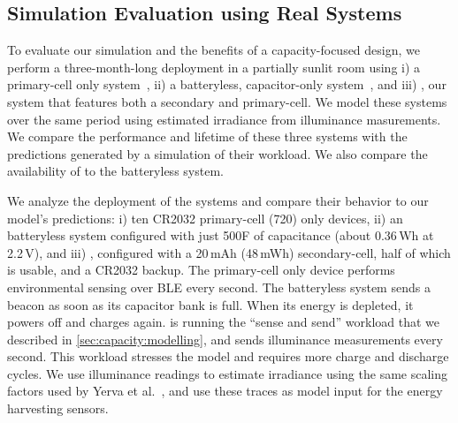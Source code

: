\subsection{Simulation Evaluation using Real Systems}
\label{sec:eval}
To evaluate our simulation and the benefits of a capacity-focused design, 
we perform a three-month-long deployment in a partially sunlit room
using i) a primary-cell only system~\cite{adkins2015michigan}, ii) a batteryless, capacitor-only system~\cite{campbellEnergy14}, and iii) \name, our
system that features both a secondary and primary-cell. 
We model these
systems over the same period using estimated irradiance from \name illuminance masurements. 
We compare the performance and lifetime of these three systems with the predictions generated by a simulation of their workload. 
We also compare the availability of \name to the batteryless system.


We analyze the deployment of the systems 
and compare their behavior to our
model's predictions: i) ten CR2032 primary-cell (720\ssi{\milli\Wh}) only devices, ii) an
batteryless system configured with just 500\textmu F of capacitance (about
0.36\,\textmu Wh at 2.2\,V), and iii) \name, configured with a 20\,mAh
(48\,mWh) secondary-cell, half of which is usable, and a CR2032 backup.  The
primary-cell only device performs environmental sensing over BLE every second.
The batteryless system  sends a beacon as soon as its capacitor bank is full.
When its energy is depleted, it powers off and charges
again. \name is running the ``sense and send'' workload that we described in
\cref{sec:capacity:modelling}, and sends illuminance measurements every second. This
workload stresses the model and requires more charge and discharge cycles.  We
use \name illuminance readings to estimate irradiance using the same scaling factors used by
Yerva et al.~\cite{yervaGrafting12}, and use these traces as
model input for the energy harvesting sensors.

